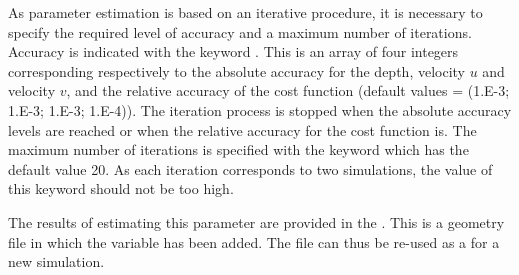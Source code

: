As parameter estimation is based on an iterative procedure, it is necessary to
specify the required level of accuracy and a maximum number of iterations.
Accuracy is indicated with the keyword .
This is an array of four integers corresponding respectively to the absolute
accuracy for the depth, velocity $u$ and velocity $v$, and the relative accuracy
of the cost function (default values = (1.E-3; 1.E-3; 1.E-3; 1.E-4)).
The iteration process is stopped when the absolute accuracy levels are reached
or when the relative accuracy for the cost function is.
The maximum number of iterations is specified with the keyword
 which has the default
value 20.
As each iteration corresponds to two simulations,
the value of this keyword should not be too high.

The results of estimating this parameter are provided in the
.
This is a geometry file in which the  variable has been added.
The file can thus be re-used as a  for a new simulation.
